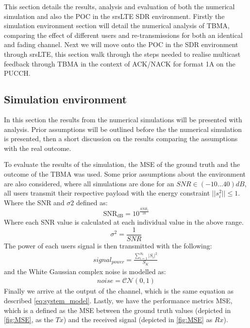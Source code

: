 \documentclass{article}
\begin{document}
This section details the results, analysis and evaluation of both the numerical simulation and also the \ac{POC} in the srsLTE SDR environment. Firstly the simulation environment section will detail the numerical analysis of TBMA, comparing the effect of different users and re-transmissions for both an identical and fading channel. Next we will move onto the \ac{POC} in the SDR environment through srsLTE, this section walk through the steps needed to realise multicast feedback through TBMA in the context of ACK/NACK for format 1A on the PUCCH.  

\subsection{Simulation environment}
In this section the results from the numerical simulations will be presented with analysis. Prior assumptions will be outlined before the the numerical simulation is presented, then a short discussion on the results comparing the assumptions with the real outcome. 

To evaluate the results of the simulation, the \ac{MSE} of the ground truth and the outcome of the TBMA was used. Some prior assumptions about the environment are also considered, where all simulations are done for an $SNR \in (-10\dots40)dB$, all users transmit their respective payload with the energy constraint  $||s_{i}^2|| \leq 1$.  
Where the SNR and $\sigma2$ defined as:
\begin{equation} 
\text{SNR}_{\text{dB}} = 10^{\frac{SNR_{i}}{10}}    
\end{equation}
Where each SNR value is calculated at each individual value in the above range.
\begin{equation}
    \sigma^2 = \frac{1}{SNR}
\end{equation}
The power of each users signal is then transmitted with the following:
\begin{align}
    signal_{power} = \frac{\sum\limits_{i=1}^{S_{k}}|S_{i}|^2 }{S_{K}} \     
\end{align}
and the White Gaussian complex noise is modelled as:
\begin{align}
    noise = \mathcal{CN}(0,1)
\end{align}
Finally we arrive at the output of the channel, which is the same equation as described \cref{eq:system_model}. Lastly, we have the performance metrics MSE, which is a defined as the MSE between the ground truth values (depicted in \ref{fig:MSE}, as the $Tx$) and the received signal (depicted in \ref{fig:MSE} as $Rx$).
\end{document}
